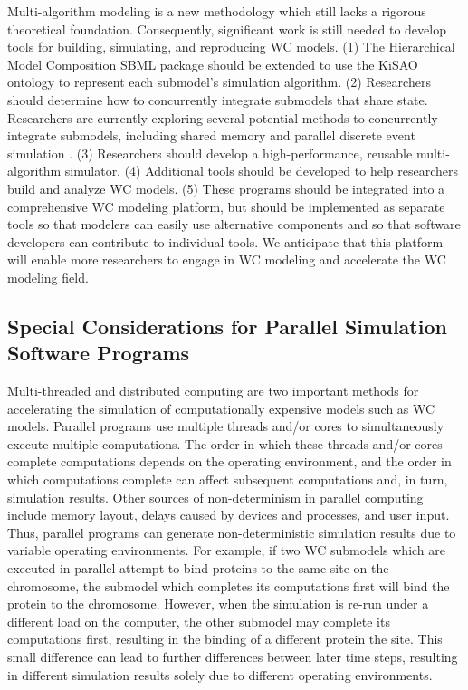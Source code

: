 \documentclass[journal,transmag,twoside]{IEEEtran}
\begin{document}
Multi-algorithm modeling is a new methodology which still lacks a rigorous theoretical foundation. Consequently, significant work is still needed to develop tools for building, simulating, and reproducing WC models. (1) The Hierarchical Model Composition SBML package should be extended to use the KiSAO ontology \cite{courtot2011controlled} to represent each submodel's simulation algorithm. (2) Researchers should determine how to concurrently integrate submodels that share state. Researchers are currently exploring several potential methods to concurrently integrate submodels, including shared memory and parallel discrete event simulation \cite{Goldberg2016}. (3) Researchers should develop a high-performance, reusable multi-algorithm simulator. (4) Additional tools should be developed to help researchers build and analyze WC models. (5) These programs should be integrated into a comprehensive WC modeling platform, but should be implemented as separate tools so that modelers can easily use alternative components and so that software developers can contribute to individual tools. We anticipate that this platform will enable more researchers to engage in WC modeling and accelerate the WC modeling field.

\subsection{Special Considerations for Parallel Simulation Software Programs}

Multi-threaded and distributed computing are two important methods for accelerating the simulation of computationally expensive models such as WC models. Parallel programs use multiple threads and/or cores to simultaneously execute multiple computations. The order in which these threads and/or cores complete computations depends on the operating environment, and the order in which computations complete can affect subsequent computations and, in turn, simulation results. Other sources of non-determinism in parallel computing include memory layout, delays caused by devices and processes, and user input. Thus, parallel programs can generate non-deterministic simulation results due to variable operating environments. For example, if two WC submodels which are executed in parallel attempt to bind proteins to the same site on the chromosome, the submodel which completes its computations first will bind the protein to the chromosome. However, when the simulation is re-run under a different load on the computer, the other submodel may complete its computations first, resulting in the binding of a different protein the site. This small difference can lead to further differences between later time steps, resulting in different simulation results solely due to different operating environments.
\end{document}
